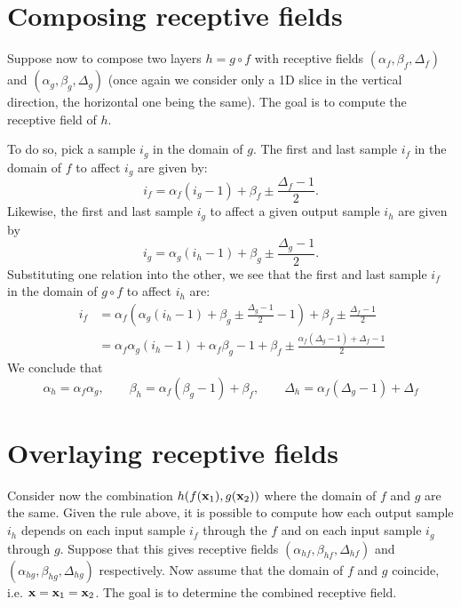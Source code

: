 \section{Composing receptive fields}\label{s:receptive-composing}

Suppose now to compose two layers $h = g \circ f$ with receptive fields $(\alpha_f, \beta_f, \Delta_f)$ and $(\alpha_g, \beta_g, \Delta_g)$ (once again we consider only a 1D slice in the vertical direction, the horizontal one being the same). The goal is to compute the receptive field of $h$.

To do so, pick a sample $i_g$ in the domain of $g$. The first and last sample $i_f$ in the domain of $f$ to affect $i_g$ are given by:
\[
  i_f = \alpha_f (i_g- 1) + \beta_f \pm \frac{\Delta_f - 1}{2}.
\]
Likewise, the first and last sample $i_g$ to affect a given output sample $i_h$ are given by
\[
  i_g = \alpha_g (i_h- 1) + \beta_g \pm \frac{\Delta_g - 1}{2}.
\]
Substituting one relation into the other, we see that the first and last sample $i_f$ in the domain of $g \circ f$ to affect $i_h$ are:
\begin{align*}\
 i_f &= \alpha_f \left(\alpha_g (i_h- 1) + \beta_g \pm \frac{\Delta_g - 1}{2} - 1\right) + \beta_f \pm \frac{\Delta_f - 1}{2}	
 \\
&= \alpha_f\alpha_g (i_h-1)
 + \alpha_f \beta_g - 1 + \beta_f
 \pm \frac{\alpha_f (\Delta_g - 1) + \Delta_f -1}{2}
\end{align*}
We conclude that
\[
\alpha_h = \alpha_f \alpha_g,
\qquad
\beta_h =  \alpha_f (\beta_g - 1) + \beta_f,
\qquad
\Delta_h = \alpha_f (\Delta_g - 1) + \Delta_f
\]

\section{Overlaying receptive fields}\label{s:receptive-overlying}

Consider now the combination $h(f(\mathbf{x}_1), g(\mathbf{x}_2))$ where the domain of $f$ and $g$ are the same. Given the rule above, it is possible to compute how each output sample $i_h$ depends on each input sample $i_f$ through the $f$ and on each input sample $i_g$ through $g$. Suppose that this gives receptive fields $(\alpha_{hf}, \beta_{hf}, \Delta_{hf})$ and $(\alpha_{hg}, \beta_{hg}, \Delta_{hg})$ respectively. Now assume that the domain of $f$ and $g$ coincide, i.e. $\mathbf{x} = \mathbf{x}_1 = \mathbf{x}_2$. The goal is to determine the combined receptive field.

